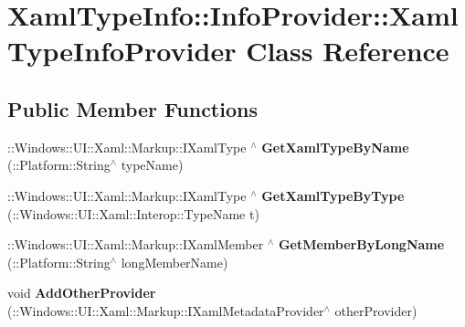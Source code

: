 \hypertarget{class_xaml_type_info_1_1_info_provider_1_1_xaml_type_info_provider}{}\section{Xaml\+Type\+Info\+:\+:Info\+Provider\+:\+:Xaml\+Type\+Info\+Provider Class Reference}
\label{class_xaml_type_info_1_1_info_provider_1_1_xaml_type_info_provider}
\subsection*{Public Member Functions}
\begin{DoxyCompactItemize}
\item 
\mbox{\label{class_xaml_type_info_1_1_info_provider_1_1_xaml_type_info_provider_a884b800e91fa2666bc4154420eefccf2}} 
\+::Windows\+::\+U\+I\+::\+Xaml\+::\+Markup\+::\+I\+Xaml\+Type $^\wedge$ {\bfseries Get\+Xaml\+Type\+By\+Name} (\+::Platform\+::\+String$^\wedge$ type\+Name)
\item 
\mbox{\label{class_xaml_type_info_1_1_info_provider_1_1_xaml_type_info_provider_a61a7092d4197201ffb0904659c1ea89a}} 
\+::Windows\+::\+U\+I\+::\+Xaml\+::\+Markup\+::\+I\+Xaml\+Type $^\wedge$ {\bfseries Get\+Xaml\+Type\+By\+Type} (\+::Windows\+::\+U\+I\+::\+Xaml\+::\+Interop\+::\+Type\+Name t)
\item 
\mbox{\label{class_xaml_type_info_1_1_info_provider_1_1_xaml_type_info_provider_af84a49d4e30e1ed575cc8b2ac9c47e54}} 
\+::Windows\+::\+U\+I\+::\+Xaml\+::\+Markup\+::\+I\+Xaml\+Member $^\wedge$ {\bfseries Get\+Member\+By\+Long\+Name} (\+::Platform\+::\+String$^\wedge$ long\+Member\+Name)
\item 
\mbox{\label{class_xaml_type_info_1_1_info_provider_1_1_xaml_type_info_provider_a9b6eea2111a9c404fc281b94389c5b87}} 
void {\bfseries Add\+Other\+Provider} (\+::Windows\+::\+U\+I\+::\+Xaml\+::\+Markup\+::\+I\+Xaml\+Metadata\+Provider$^\wedge$ other\+Provider)
\item 

\end{DoxyCompactItemize}
